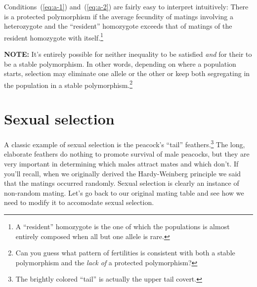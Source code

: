 Conditions~(\ref{eq:a-1}) and~(\ref{eq:a-2}) are fairly easy to
interpret intuitively: There is a protected polymorphism if the
average fecundity of matings involving a heterozygote and the
``resident'' homozygote exceeds that of matings of the resident
homozygote with itself.\footnote{A ``resident'' homozygote is the one
  of which the populations is almost entirely composed when all but
  one allele is rare.}

{\bf NOTE:} It's entirely possible for neither inequality to be
satisfied {\it and\/} for their to be a stable polymorphism. In other
words, depending on where a population starts, selection may eliminate
one allele or the other or keep both segregating in the population in
a stable polymorphism.\footnote{Can you guess what pattern of
  fertilities is consistent with both a stable polymorphism and the
  {\it lack of\/} a protected polymorphism?}

\section*{Sexual selection}

A classic example of sexual selection is the peacock's ``tail''
feathers.\footnote{The brightly colored ``tail'' is actually the upper
  tail covert.} The long, elaborate feathers do nothing to promote
survival of male peacocks, but they are very important in determining
which males attract mates and which don't. If you'll recall, when we
originally derived the Hardy-Weinberg principle we said that the
matings occurred randomly. Sexual selection is clearly an instance of
non-random mating. Let's go back to our original mating table and see
how we need to modify it to accomodate sexual selection.

